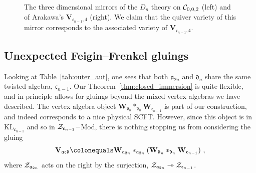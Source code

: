 \documentclass[a4paper]{article}
\def\CC{{\cal C}}
\def\ZZ{{\cal Z}}
\def\af{\mathfrak{a}}
\def\ccf{\mathfrak{c}}
\def\df{\mathfrak{d}}
\def \KL{\mathrm{KL}}
\def\W{\mathbf{W}}
\def\V{\mathbf{V}}
\begin{document}
\begin{figure}[ht]
\begin{minipage}{.45\textwidth}

\end{minipage}
\caption{\label{fig:CnDn-four-punctured}The three dimensional mirrors of the $D_n$ theory on $\CC_{0,0,2}$ (left) and of Arakawa's $\V_{{\mathfrak c}_{n-1},4}$ (right). We claim that the quiver variety of this mirror corresponds to the associated variety of $\V_{{\mathfrak c}_{n-1},4}$.}
\end{figure}

\subsection{\label{ssec:acd_gluing}Unexpected Feigin--Frenkel gluings}

Looking at Table~\ref{tab:outer_aut}, one sees that both $\af_{2n}$ and $\df_n$ share the same twisted algebra, $\mathfrak{c}_{n-1}$. Our Theorem~\ref{thm:closed_immersion} is quite flexible, and in principle allows for gluings beyond the mixed vertex algebras we have described. The vertex algebra object $\W_{\df_n}\ast_{\df_n} \W_{{\mathfrak c}_{n-1}}$ is part of our construction, and indeed corresponds to a nice physical SCFT. However, since this object is in $\KL_{{\mathfrak c}_{n-1}}$ and so in $\ZZ_{{\mathfrak c}_{n-1}}-$Mod, there is nothing stopping us from considering the gluing
\begin{equation}
	\V_{\af\ccf\df}\colonequals\W_{\af_{2n}}\ast_{\af_{2n}}(\W_{\df_n}\ast_{\df_n}\W_{{\mathfrak c}_{n-1}})~,
\end{equation}
where $\ZZ_{\af_{2n}}$ acts on the right by the surjection, $\ZZ_{\af_{2n}}\twoheadrightarrow \ZZ_{{\mathfrak c}_{n-1}}$.
\end{document}
